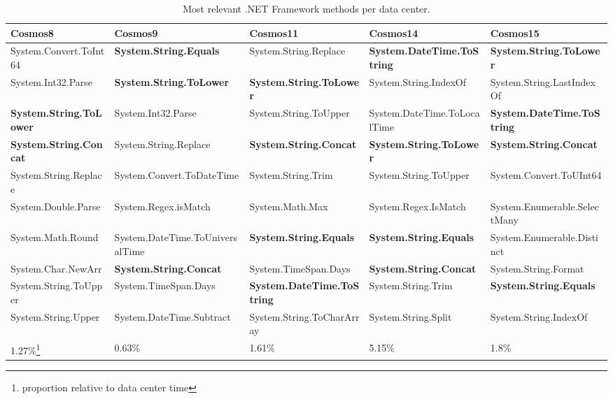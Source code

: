 \begin{table}[ht]
\small
 \begin{tabular}{@{}llllp{3.5cm}@{}}

  Cosmos8 & Cosmos9 & Cosmos11 & Cosmos14 & Cosmos15 \\
 \midrule
System.Convert.ToInt64 & \textbf{System.String.Equals} & System.String.Replace & \textbf{System.DateTime.ToString} & \textbf{System.String.ToLower} \\
System.Int32.Parse & \textbf{System.String.ToLower} & \textbf{System.String.ToLower} & System.String.IndexOf & System.String.LastIndexOf \\
\textbf{System.String.ToLower} & System.Int32.Parse & System.String.ToUpper & System.DateTime.ToLocalTime & \textbf{System.DateTime.ToString}\\
\textbf{System.String.Concat} & System.String.Replace & \textbf{System.String.Concat} & \textbf{System.String.ToLower} & \textbf{System.String.Concat}\\
System.String.Replace & System.Convert.ToDateTime & System.String.Trim & System.String.ToUpper & System.Convert.ToUInt64 \\
System.Double.Parse & System.Regex.isMatch & System.Math.Max & System.Regex.IsMatch & System.Enumerable.SelectMany \\
System.Math.Round& System.DateTime.ToUniversalTime & \textbf{System.String.Equals} & \textbf{System.String.Equals} & System.Enumerable.Distinct \\
System.Char.NewArr & \textbf{System.String.Concat} & System.TimeSpan.Days & \textbf{System.String.Concat} & System.String.Format \\
System.String.ToUpper & System.TimeSpan.Days & \textbf{System.DateTime.ToString} & System.String.Trim & \textbf{System.String.Equals}\\
System.String.Upper & System.DateTime.Subtract & System.String.ToCharArray & System.String.Split & System.String.IndexOf \\

\midrule
1.27\%\footnote{proportion relative to data center time} & 0.63\% & 1.61\% & 5.15\% & 1.8\%\\
\midrule

\end{tabular}
 \label{tb:rankedMethods}
\caption{Most relevant .NET Framework methods per data center.}
\end{table}


